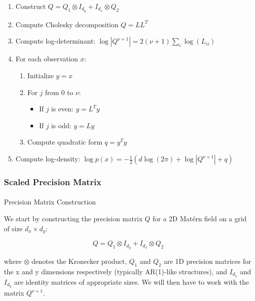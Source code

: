 \documentclass[journal=,manuscript=]{achemso}
\makeatletter
\let\oldparagraph\paragraph
\renewcommand{\paragraph}{
    \@ifstar
      \xxxParagraphStar
      \xxxParagraphNoStar
  }
\newcommand{\xxxParagraphStar}[1]{\oldparagraph*{#1}\mbox{}}
\newcommand{\xxxParagraphNoStar}[1]{\oldparagraph{#1}\mbox{}}
\providecommand{\tightlist}{%
  \setlength{\itemsep}{0pt}\setlength{\parskip}{0pt}}\usepackage{longtable,booktabs,array}
\makeatother
\begin{document}
\begin{enumerate}
\def\labelenumi{\arabic{enumi}.}
\tightlist
\item
  Construct \(Q = Q_1 \otimes I_{d_y} + I_{d_x} \otimes Q_2\)
\item
  Compute Cholesky decomposition \(Q = LL^T\)
\item
  Compute log-determinant:
  \(\log|Q^{\nu+1}| = 2(\nu+1)\sum_{i}\log(L_{ii})\)
\item
  For each observation \(x\):

  \begin{enumerate}
  \def\labelenumii{\roman{enumii})}
  \tightlist
  \item
    Initialize \(y = x\)
  \item
    For \(j\) from 0 to \(\nu\):

    \begin{itemize}
    \tightlist
    \item
      If \(j\) is even: \(y = L^T y\)
    \item
      If \(j\) is odd: \(y = L y\)
    \end{itemize}
  \item
    Compute quadratic form \(q = y^Ty\)
  \end{enumerate}
\item
  Compute log-density:
  \(\log p(x) = -\frac{1}{2}(d\log(2\pi) + \log|Q^{\nu+1}| + q)\)
\end{enumerate}

\subsubsection{Scaled Precision Matrix}\label{scaled-precision-matrix}

\paragraph{Precision Matrix
Construction}\label{precision-matrix-construction-1}

We start by constructing the precision matrix \(Q\) for a 2D Matérn
field on a grid of size \(d_x \times d_y\):

\[
Q = Q_1 \otimes I_{d_y} + I_{d_x} \otimes Q_2 
\]

where \(\otimes\) denotes the Kronecker product, \(Q_1\) and \(Q_2\) are
1D precision matrices for the x and y dimensions respectively (typically
AR(1)-like structures), and \(I_{d_x}\) and \(I_{d_y}\) are identity
matrices of appropriate sizes. We will then have to work with the matrix
\(Q^{\nu + 1}\).
\end{document}
